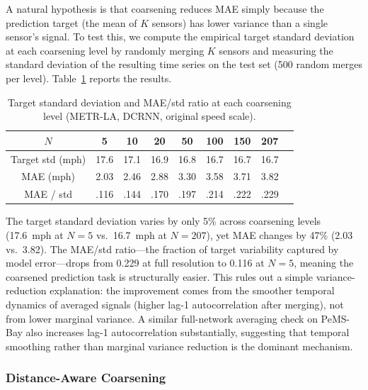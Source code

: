 \documentclass[sigconf]{acmart}
\begin{document}
A natural hypothesis is that coarsening reduces MAE simply because the prediction target (the mean of $K$ sensors) has lower variance than a single sensor's signal. To test this, we compute the empirical target standard deviation at each coarsening level by randomly merging $K$ sensors and measuring the standard deviation of the resulting time series on the test set (500 random merges per level). Table~\ref{tab:target_var} reports the results.

\begin{table}[t]
\small
\centering
\caption{Target standard deviation and MAE/std ratio at each coarsening level (METR-LA, DCRNN, original speed scale).}
\label{tab:target_var}
\begin{tabular}{ccccccccc}
\toprule
$N$ & 5 & 10 & 20 & 50 & 100 & 150 & 207 \\
\midrule
Target std (mph) & 17.6 & 17.1 & 16.9 & 16.8 & 16.7 & 16.7 & 16.7 \\
MAE (mph)        & 2.03 & 2.46 & 2.88 & 3.30 & 3.58 & 3.71 & 3.82 \\
MAE / std        & .116 & .144 & .170 & .197 & .214 & .222 & .229 \\
\bottomrule
\end{tabular}
\end{table}

The target standard deviation varies by only 5\% across coarsening levels (17.6~mph at $N{=}5$ vs.\ 16.7~mph at $N{=}207$), yet MAE changes by 47\% (2.03 vs.\ 3.82). The MAE/std ratio---the fraction of target variability captured by model error---drops from 0.229 at full resolution to 0.116 at $N{=}5$, meaning the coarsened prediction task is structurally easier. This rules out a simple variance-reduction explanation: the improvement comes from the smoother temporal dynamics of averaged signals (higher lag-1 autocorrelation after merging), not from lower marginal variance. A similar full-network averaging check on PeMS-Bay also increases lag-1 autocorrelation substantially, suggesting that temporal smoothing rather than marginal variance reduction is the dominant mechanism.

\subsubsection{Distance-Aware Coarsening}
\end{document}
